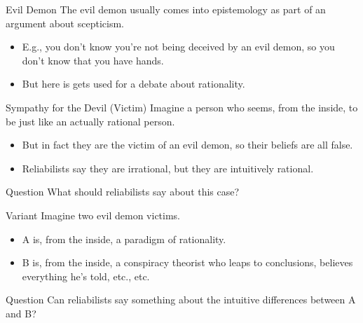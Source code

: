 \documentclass[
  17pt,
  letterpaper,
  ignorenonframetext,
  aspectratio=169,
  handout]{beamer}
\providecommand{\tightlist}{%
  \setlength{\itemsep}{0pt}\setlength{\parskip}{0pt}}\usepackage{longtable,booktabs,array}
\begin{document}
\begin{frame}{Evil Demon}
\protect\hypertarget{evil-demon}{}
The evil demon usually comes into epistemology as part of an argument
about scepticism.

\begin{itemize}[<+->]
\tightlist
\item
  E.g., you don't know you're not being deceived by an evil demon, so
  you don't know that you have hands.
\item
  But here is gets used for a debate about rationality.
\end{itemize}
\end{frame}

\begin{frame}{Sympathy for the Devil (Victim)}
\protect\hypertarget{sympathy-for-the-devil-victim}{}
Imagine a person who seems, from the inside, to be just like an actually
rational person.

\begin{itemize}[<+->]
\tightlist
\item
  But in fact they are the victim of an evil demon, so their beliefs are
  all false.
\item
  Reliabilists say they are irrational, but they are intuitively
  rational.
\end{itemize}
\end{frame}

\begin{frame}{Question}
\protect\hypertarget{question-1}{}
What should reliabilists say about this case?
\end{frame}

\begin{frame}{Variant}
\protect\hypertarget{variant}{}
Imagine two evil demon victims.

\begin{itemize}[<+->]
\tightlist
\item
  A is, from the inside, a paradigm of rationality.
\item
  B is, from the inside, a conspiracy theorist who leaps to conclusions,
  believes everything he's told, etc., etc.
\end{itemize}
\end{frame}

\begin{frame}{Question}
\protect\hypertarget{question-2}{}
Can reliabilists say something about the intuitive differences between A
and B?
\end{frame}
\end{document}
